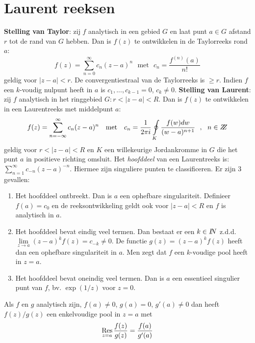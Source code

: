 \documentclass[twoside]{report}
\begin{document}
\section{Laurent reeksen}
{\bf Stelling van Taylor}: zij $f$ analytisch in een gebied $G$ en laat punt
$a\in G$ afstand $r$ tot de rand van $G$ hebben. Dan is $f(z)$ te ontwikkelen
in de Taylorreeks rond $a$:
\[
f(z)=\sum_{n=0}^\infty c_n(z-a)^n~~~\mbox{met}~~~c_n=\frac{f^{(n)}(a)}{n!}
\]
geldig voor $|z-a|<r$. De convergentiestraal van de Taylorreeks is $\geq r$.
Indien $f$ een $k$-voudig nulpunt heeft in $a$ is $c_1,...,c_{k-1}=0$, $c_k\neq0$.
\npar
{\bf Stelling van Laurent}: zij $f$ analytisch in het ringgebied
$G:r<|z-a|<R$. Dan is $f(z)$ te ontwikkelen in een Laurentreeks met
middelpunt $a$:
\[
f(z)=\sum_{n=-\infty}^\infty c_n(z-a)^n~~~\mbox{met}~~~
c_n=\frac{1}{2\pi i}\oint\limits_K\frac{f(w)dw}{(w-a)^{n+1}}~~,~~n\in Z\hspace{-1ex}Z
\]
geldig voor $r<|z-a|<R$ en $K$ een willekeurige Jordankromme in $G$ die het
punt $a$ in positieve richting omsluit.
\npar
Het {\it hoofddeel} van een Laurentreeks is: $\sum\limits_{n=1}^\infty c_{-n}(z-a)^{-n}$.
Hiermee zijn singuliere punten te classificeren. Er zijn 3 gevallen:
\begin{enumerate}
\item Het hoofddeel ontbreekt. Dan is $a$ een ophefbare singulariteit.
      Definieer $f(a)=c_0$ en de reeksontwikkeling geldt ook voor $|z-a|<R$
      en $f$ is analytisch in $a$.
\item Het hoofddeel bevat eindig veel termen. Dan bestaat er een $k\in I\hspace{-1mm}N$ z.d.d.
      $\lim\limits_{z\rightarrow a}(z-a)^kf(z)=c_{-k}\neq0$. De functie
      $g(z)=(z-a)^kf(z)$ heeft dan een ophefbare singulariteit in $a$. Men
      zegt dat $f$ een $k$-voudige pool heeft in $z=a$.
\item Het hoofddeel bevat oneindig veel termen. Dan is $a$ een essentieel
      singulier punt van $f$, bv. $\exp(1/z)$ voor $z=0$.
\end{enumerate}
Als $f$ en $g$ analytisch zijn, $f(a)\neq0$, $g(a)=0$, $g'(a)\neq0$ dan heeft
$f(z)/g(z)$ een enkelvoudige pool in $z=a$ met
\[
\mathop{\rm Res}\limits_{z=a}\frac{f(z)}{g(z)}=\frac{f(a)}{g'(a)}
\]
\end{document}
